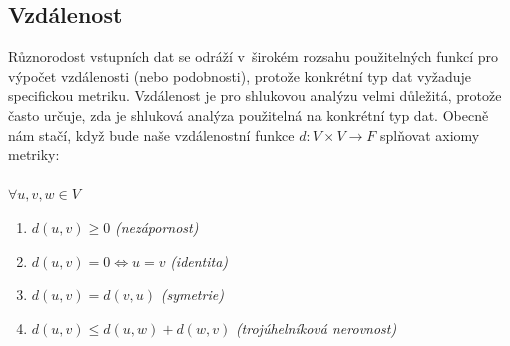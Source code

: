 
\subsection{Vzdálenost}
Různorodost vstupních dat se odráží v~širokém rozsahu použitelných funkcí pro výpočet vzdálenosti (nebo podobnosti), protože konkrétní typ dat vyžaduje specifickou metriku. Vzdálenost je pro shlukovou analýzu velmi důležitá, protože často určuje, zda je shluková analýza použitelná na konkrétní typ dat. Obecně nám stačí, když bude naše vzdálenostní funkce $d:V \times V \to F$ splňovat axiomy metriky:\\ \\
$ \forall  u, v, w \in V$
\begin{enumerate}
\item $d(u, v)\geq 0$ \textit{(nezápornost)}
\item $d(u, v) = 0 \iff u = v$ \textit{(identita)}
\item $d(u, v) = d(v, u)$ \textit{(symetrie)}
\item$d(u, v) \leq d(u, w) + d(w, v)$ \textit{(trojúhelníková nerovnost)}
\end{enumerate}

